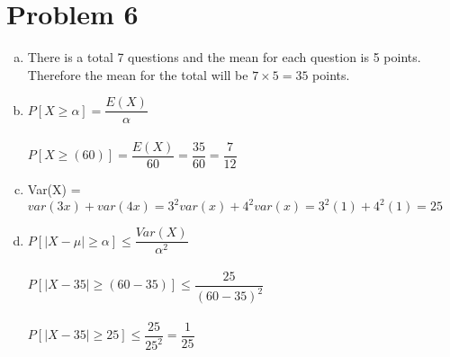\documentclass[11pt,letterpaper]{article}
\begin{document}
\section*{Problem 6}
\begin{enumerate}[(a)]
\item
There is a total 7 questions and the mean for each question is 5 points. Therefore the mean for the total will be $7\times 5 = 35$ points.
\item
$P[X\geq \alpha] = \dfrac{E(X)}{\alpha}$\\\\
$P[X\geq (60)] = \dfrac{E(X)}{60} = \dfrac{35}{60} = \dfrac{7}{12}$\\
\item
Var(X) = $var(3x)+ var(4x) = 3^2var(x) + 4^2var(x) = 3^2(1) + 4^2(1) = 25$\\
\item
$P[|X-\mu|\geq \alpha] \leq \dfrac{Var(X)}{\alpha^2}$\\\\
$P[|X-35|\geq (60-35)] \leq \dfrac{25}{(60-35)^2}$\\\\
$P[|X-35|\geq 25] \leq \dfrac{25}{25^2} = \dfrac{1}{25}$\\
\end{enumerate}
\clearpage
\end{document}
